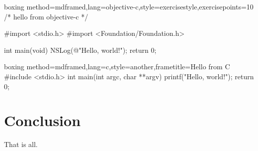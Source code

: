 \documentclass[10pt,a4paper]{article}
\begin{document}
\begin{pygmented}{boxing method=mdframed,lang=objective-c,style=exercisestyle,exercisepoints=10}
/* hello from objective-c */

#import <stdio.h>
#import <Foundation/Foundation.h>

int main(void)
{
NSLog(@"Hello, world!\n");
return 0;
}
\end{pygmented}


\begin{pygmented}{boxing method=mdframed,lang=c,style=another,frametitle={Hello from C}}
#include <stdio.h>
int main(int argc, char **argv) {
printf("Hello, world!\n");
return 0;
}
\end{pygmented}


\section{Conclusion}

That is all.
\end{document}
